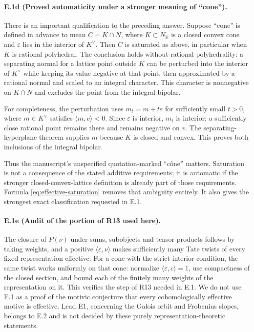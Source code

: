 \paragraph{E.1d (Proved automaticity under a stronger meaning of ``cone'').}
There is an important qualification to the preceding answer. Suppose
``cone'' is defined in advance to mean
$C=K\cap N$, where $K\subset N_{\mathbb R}$ is a closed convex cone
and $\varepsilon$ lies in the interior of $K^\vee$.
Then $C$ is saturated as above, in particular when $K$ is rational
polyhedral. The conclusion holds without rational polyhedrality:
a separating
normal for a lattice point outside $K$ can be perturbed into the
interior of $K^\vee$ while keeping its value negative at that point,
then approximated by a rational normal and scaled to an integral
character. This character is nonnegative on $K\cap N$ and excludes
the point from the integral bipolar.

For completeness, the perturbation uses
$m_t=m+t\varepsilon$ for sufficiently small $t>0$, where
$m\in K^\vee$ satisfies $\langle m,v\rangle<0$.
Since $\varepsilon$ is interior, $m_t$ is interior; a sufficiently
close rational point remains there and remains negative on $v$.
The separating-hyperplane theorem supplies $m$ because $K$ is closed
and convex. This proves both inclusions of the integral bipolar.

Thus the manuscript's unspecified quotation-marked ``c\^one'' matters.
Saturation is not a consequence of the stated additive requirements;
it is automatic if the stronger closed-convex-lattice definition is
already part of those requirements. Formula
\eqref{eq:effective-saturation} removes that ambiguity entirely.
It also gives the strongest exact classification requested in E.1.

\paragraph{E.1e (Audit of the portion of R13 used here).}
The closure of $P(\nu)$ under sums, subobjects and tensor products
follows by taking weights, and a positive
$\langle\varepsilon,\nu\rangle$ makes sufficiently many Tate twists
of every fixed representation effective. For a cone with the strict
interior condition, the same twist works uniformly on that cone:
normalize $\langle\varepsilon,c\rangle=1$, use compactness of the
closed section, and bound each of the finitely many weights of the
representation on it. This verifies the step of R13 needed in E.1.
We do not use E.1 as a proof of the motivic conjecture that every
cohomologically effective motive is effective. Lead E1, concerning
the Galois orbit and Frobenius slopes, belongs to E.2 and is not
decided by these purely representation-theoretic statements.

